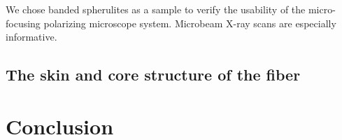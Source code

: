 \documentclass{Head}
\begin{document}
We chose banded spherulites as a sample to verify the usability of the micro-focusing polarizing microscope system.
Microbeam X-ray scans are especially informative.
\subsection{The skin and core structure of the fiber}
\section{Conclusion}

\end{document}
